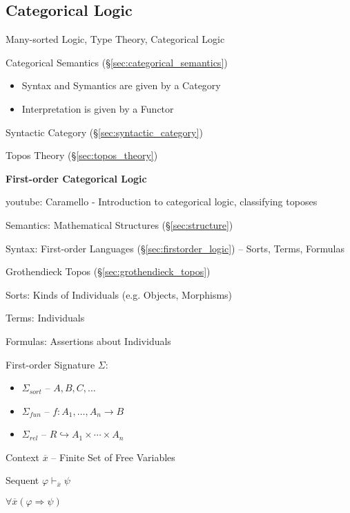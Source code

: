 \subsection{Categorical Logic}\label{sec:categorical_logic}

Many-sorted Logic, Type Theory, Categorical Logic

Categorical Semantics (\S\ref{sec:categorical_semantics})

\begin{itemize}
  \item Syntax and Symantics are given by a Category
  \item Interpretation is given by a Functor
\end{itemize}

Syntactic Category (\S\ref{sec:syntactic_category})

Topos Theory (\S\ref{sec:topos_theory})


\textbf{First-order Categorical Logic}

youtube: Caramello - Introduction to categorical logic, classifying
toposes

Semantics: Mathematical Structures (\S\ref{sec:structure})

Syntax: First-order Languages (\S\ref{sec:firstorder_logic}) --
Sorts, Terms, Formulas

Grothendieck Topos (\S\ref{sec:grothendieck_topos})

Sorts: Kinds of Individuals (e.g. Objects, Morphisms) %

Terms: Individuals

Formulas: Assertions about Individuals


First-order Signature $\Sigma$:
\begin{itemize}
  \item $\Sigma_{sort}$ -- $A,B,C,\ldots$
  \item $\Sigma_{fun}$ -- $f : A_1, \ldots, A_n \rightarrow B$
  \item $\Sigma_{rel}$ -- $R \hookrightarrow A_1 \times \cdots \times
    A_n$
\end{itemize}

Context $\overline{x}$ -- Finite Set of Free Variables

Sequent $\varphi \vdash_{\overline{x}} \psi$

$\forall \overline{x} (\varphi \Rightarrow \psi)$

